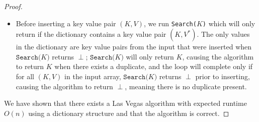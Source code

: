\documentclass[11pt]{scrartcl}
\theoremstyle{dotlessP}
\theoremstyle{dotlessN}
\begin{document}
\begin{proof}
\begin{itemize}
		\item Before inserting a key value pair $(K,V)$, we run \texttt{Search($K$)} which will only return if the dictionary contains a key value pair $(K,V^*)$. The only values in the dictionary are key value pairs from the input that were inserted when $\texttt{Search($K$)}$ returns $\perp$; $\texttt{Search($K$)}$ will only return $K$, causing the algorithm to return $K$ when there exists a duplicate, and the loop will complete only if for all $(K,V)$ in the input array, $\texttt{Search($K$)}$ returns $\perp$ prior to inserting, causing the algorithm to return  $\perp$, meaning there is no duplicate present.
	\end{itemize}
	We have shown that there exists a Las Vegas algorithm with expected runtime $O(n)$ using a dictionary structure and that the algorithm is correct.
\end{proof}
\end{document}
